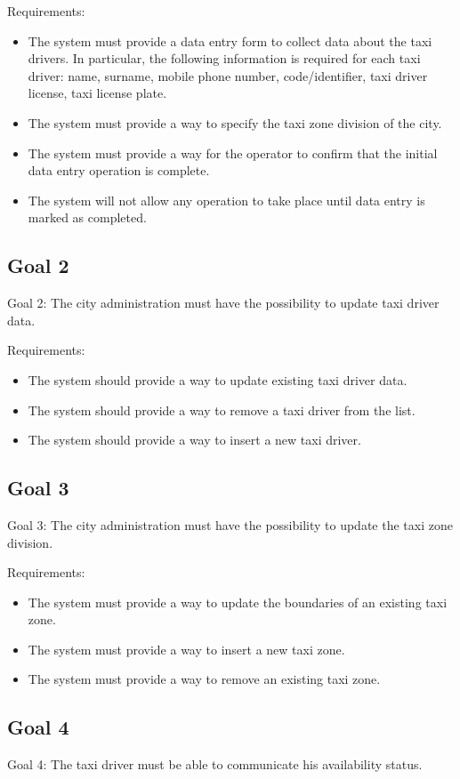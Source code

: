 Requirements:
\begin{itemize}
\item The system must provide a data entry form to collect data about the taxi drivers. In particular, the following information is required for each taxi driver: name, surname, mobile phone number, code/identifier, taxi driver license, taxi license plate.
\item The system must provide a way to specify the taxi zone division of the city. 
\item The system must provide a way for the operator to confirm that the initial data entry operation is complete. 
\item The system will not allow any operation to take place until data entry is marked as completed. 
\end{itemize}

\subsection{Goal 2}
Goal 2: The city administration must have the possibility to update taxi driver data.

Requirements:
\begin{itemize}
\item The system should provide a way to update existing taxi driver data. 
\item The system should provide a way to remove a taxi driver from the list.
\item The system should provide a way to insert a new taxi driver.
\end{itemize}

\subsection{Goal 3}
Goal 3: The city administration must have the possibility to update the taxi zone division.

Requirements:
\begin{itemize}
\item The system must provide a way to update the boundaries of an existing taxi zone. 
\item The system must provide a way to insert a new taxi zone.
\item The system must provide a way to remove an existing taxi zone.
\end{itemize}

\subsection{Goal 4}
Goal 4: The taxi driver must be able to communicate his availability status.

